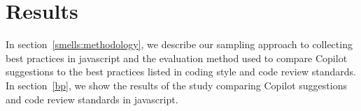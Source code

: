 \section{Results}
\label{chapter:results}


In section~\ref{smells:methodology}, we describe our sampling approach to collecting best practices in javascript and the evaluation method used to compare Copilot suggestions to the best practices listed in coding style and code review standards. 
In section~\ref{bp}, we show the results of the study comparing Copilot suggestions and code review standards in javascript.




